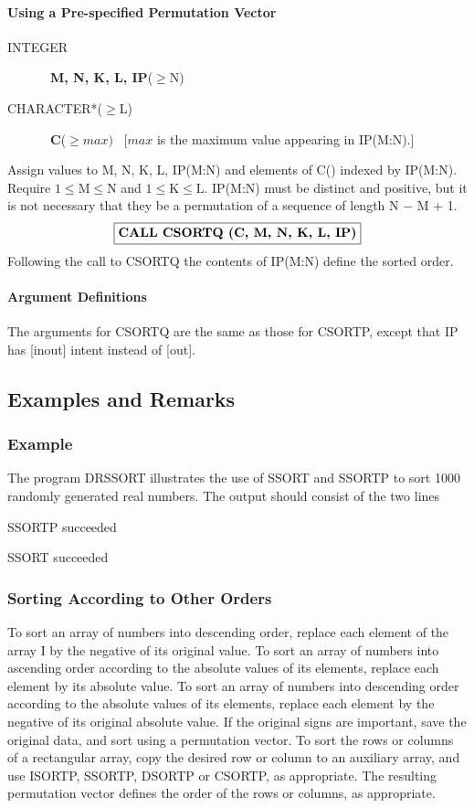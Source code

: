 \documentclass[twoside]{MATH77}
\begin{document}
\paragraph{Using a Pre-specified Permutation Vector}

\begin{description}
\item[INTEGER]  \ {\bf M, N, K, L, IP}($\geq $N)

\item[CHARACTER*($\geq ${\rm L})]  \ {\bf C}($\geq max)$ ~{[$max$ is the maximum
value appearing in IP(M:N).]}
\end{description}

Assign values to M, N, K, L, IP(M:N) and elements of C() indexed by IP(M:N).
Require $1 \leq \text{M} \leq \text{N}$ and $1\leq \text{K}\leq \text{L}.$
IP(M:N) must be distinct and positive, but it is not necessary that they be
a permutation of a sequence of length N $-$ M + 1.
$$
\fbox{{\bf CALL CSORTQ (C, M, N, K, L, IP)}}
$$
Following the call to CSORTQ the contents of IP(M:N) define the
sorted order.

\paragraph{Argument Definitions}

The arguments for CSORTQ are the same as those for CSORTP, except
that IP has [inout] intent instead of [out].

\subsection{Examples and Remarks}

\subsubsection{Example}

The program DRSSORT illustrates the use of SSORT and SSORTP to sort 1000
randomly generated real numbers. The output should consist of the two lines

SSORTP succeeded

SSORT succeeded

\subsubsection{Sorting According to Other Orders}

To sort an array of numbers into descending order, replace each element of
the array I by the negative of its original value. To sort an array of
numbers into ascending order according to the absolute values of its
elements, replace each element by its absolute value. To sort an array of
numbers into descending order according to the absolute values of its
elements, replace each element by the negative of its original absolute
value.  If the original signs are important, save the original data,
and sort using a permutation vector. To sort the rows or columns of a
rectangular array, copy the desired row or column to an auxiliary array,
and use ISORTP, SSORTP, DSORTP or CSORTP, as appropriate. The resulting
permutation vector defines the order of the rows or columns, as appropriate.
\end{document}
